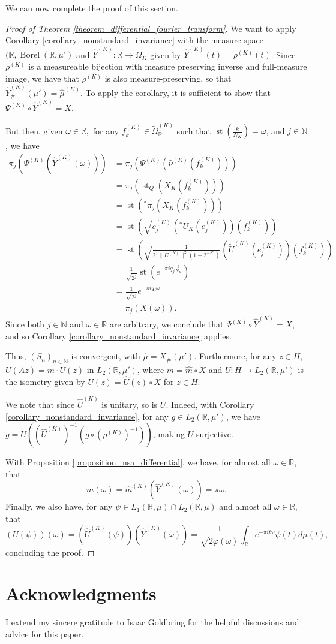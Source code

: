 \documentclass{amsart}
\theoremstyle{definition}
\theoremstyle{remark}
\def \St{\operatorname{st}}
\def \Borel{\operatorname{Borel}}
\def \HMU{\hat{\mu}}
\def \HNU{\hat{\nu}}
\def \HU{\hat{U}}
\def \Hm{\hat{m}}
\begin{document}
We can now complete the proof of this section.

\begin{proof}[Proof of  Theorem \ref{theorem_differential_fourier_transform}]
	We want to apply  Corollary \ref{corollary_nonstandard_invariance} with the measure space $(\mathbb{R},\Borel(\mathbb{R},\mu')$ and $\hat{Y}^{(K)}:\mathbb{R}\rightarrow\Omega_K$ given by $\hat{Y}^{(K)}(t)=\rho^{(K)}(t)$. Since $\rho^{(K)}$ is a measureable bijection with measure preserving inverse and full-measure image, we have that $\rho^{(K)}$ is also measure-preserving, so that $\hat{Y}^{(K)}_{\#}(\mu')=\HMU^{(K)}.$ To apply the corollary, it is sufficient to show that $\Psi^{(K)}\circ \hat{Y}^{(K)}=X.$
	
	But then, given $\omega\in\mathbb{R},$ for any $f_k^{(K)}\in\tilde{\Omega}_{\mathbb{R}}^{(K)}$ such that $\St(\frac{k}{N_K})=\omega$, and $j\in\mathbb{N}$, we have
	\begin{align*}
		\pi_j(\Psi^{(K)}(\hat{Y}^{(K)}(\omega)))&=\pi_j(\Psi^{(K)}(\HNU^{(K)}(f_k^{(K)})))\\
		&=\pi_j(\St_Q(X_K(f_k^{(K)})))\\
		&=\St({}^*\pi_j(X_K(f_k^{(K)})))\\
		&=\St(\sqrt{c_j^{(K)}}\left({}^*U_K(e_j^{(K)})\right)(f_k^{(K)}))\\
		&=\St\left(\sqrt{\frac{1}{2^j\|E^{(K)}\|^2(1-2^{-K!})}}\left(\tilde{U}^{(K)}(e_j^{(K)})\right)(f_k^{(K)})\right)\\
		&=\frac{1}{\sqrt{2^j}}\St(e^{-\pi i q_j\frac{k}{N_K}})\\
		&=\frac{1}{\sqrt{2^j}}e^{-\pi i q_j\omega}\\
		&=\pi_j(X(\omega)).
	\end{align*}
	Since both $j\in\mathbb{N}$ and $\omega\in\mathbb{R}$ are arbitrary, we conclude that $\Psi^{(K)}\circ \hat{Y}^{(K)}=X,$ and so Corollary \ref{corollary_nonstandard_invariance} applies.
	
	Thus, $(S_n)_{n\in\mathbb{N}}$ is convergent, with $\HMU=X_{\#}(\mu')$. Furthermore, for any $z\in H$, $U(Az)=m\cdot U(z)$ in $L_2(\mathbb{R},\mu')$, where $m=\Hm\circ X$  and $U:H\rightarrow L_2(\mathbb{R},\mu')$ is the isometry given by $U(z)=\HU(z)\circ X$ for $z\in H$. 
	
	We note that since $\HU^{(K)}$ is unitary, so is $U$. Indeed, with Corollary \ref{corollary_nonstandard_invariance}, for any $g\in L_2(\mathbb{R},\mu')$, we have $g=U((\HU^{(K)})^{-1}(g\circ (\rho^{(K)})^{-1}))$, making $U$ surjective. 
	
	With Proposition \ref{proposition_nsa_differential}, we  have, for almost all $\omega\in\mathbb{R}$, that $$m(\omega)=\Hm^{(K)}(\hat{Y}^{(K)}(\omega))=\pi\omega.$$ Finally, we also have, for any $\psi\in L_1(\mathbb{R},\mu)\cap L_2(\mathbb{R},\mu)$ and almost all $\omega\in\mathbb{R}$, that $$(U(\psi))(\omega)=(\HU^{(K)}(\psi))(\hat{Y}^{(K)}(\omega))=\frac{1}{\sqrt{2\varphi(\omega)}}\int_{\mathbb{R}}e^{-\pi i t\omega }\psi(t)d\mu(t),$$ concluding the proof.
\end{proof}
\section*{Acknowledgments}
I extend my sincere gratitude to Isaac Goldbring for the helpful discussions and advice for this paper.
\printbibliography
\end{document}
